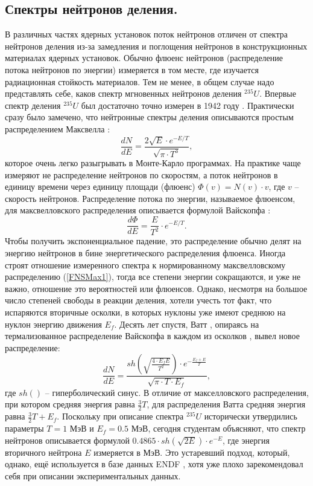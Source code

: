 \documentclass[a4paper,12pt]{article}
\begin{document}
\begin{large}
\subsection{Спектры нейтронов деления.}
\label{subSol2}

  В различных частях ядерных установок поток нейтронов отличен от спектра нейтронов деления из-за замедления и поглощения нейтронов в конструкционных материалах ядерных установок.
  Обычно флюенс нейтронов (распределение потока нейтронов по энергии) измеряется в том месте, где изучается радиационная стойкость материалов.
  Тем не менее, в общем случае надо представлять себе, каков спектр мгновенных нейтронов деления $^{235}U$.
  Впервые спектр деления $^{235}U$ был достаточно точно измерен в 1942 году \cite{Peierls42}.
  Практически сразу было замечено, что нейтронные спектры деления описываются простым распределением Максвелла \cite{Weiss37}:
  \begin{equation}
  \label{PNSMax1}
  \frac{dN}{dE}=\frac{2\sqrt{E}\cdot e^{-E/T}}{\sqrt{\pi\cdot T^3}},
  \end{equation}
  которое очень легко разыгрывать в Монте-Карло программах.
  На практике чаще измеряют не распределение нейтронов по скоростям, а поток нейтронов в единицу времени через единицу площади (флюенс) $\Phi(v)=N(v)\cdot v$, где $v$ -- скорость нейтронов.
  Распределение потока по энергии, называемое флюенсом, для максвелловского распределения описывается формулой Вайскопфа \cite{Weiss37}:
  \begin{equation}
  \label{FNSMax1}
  \frac{d\Phi}{dE}=\frac{E}{T^2}\cdot e^{-E/T}.
  \end{equation}
  Чтобы получить экспоненциальное падение, это распределение обычно делят на энергию нейтронов в бине энергетического распределения флюенса.
  Иногда строят отношение измеренного спектра к нормированному максвелловскому распределению (\ref{FNSMax1}), тогда все степени энергии сокращаются, и уже не важно, отношение это вероятностей или флюенсов.
  Однако, несмотря на большое число степеней свободы в реакции деления, хотели учесть тот факт, что испаряются вторичные осколки, в которых нуклоны уже имеют среднюю на нуклон энергию движения $E_f$.
  Десять лет спустя, Ватт \cite{Watt52}, опираясь на термализованное распределение Вайскопфа в каждом из осколков \cite{Weiss37}, вывел новое распределение:
  \begin{equation}
  \label{PNSMax2}
  \frac{dN}{dE}=\frac{sh\left(\sqrt{\frac{4\cdot E_fE}{T^2}}\right)\cdot e^{-\frac{E_f+E}{T}}}{\sqrt{\pi\cdot T\cdot E_f}},
  \end{equation}
  где $sh()$ -- гиперболический синус.
  В отличие от макселловского распределения, при котором средняя энергия равна $\frac{3}{2}T$, для распределения Ватта средняя энергия равна $\frac{3}{2}T+E_f$.
  Поскольку при описание спектра $^{235}U$ исторически утвердились параметры $T=1$ МэВ и $E_f=0.5$ МэВ, сегодня студентам объясняют, что спектр нейтронов описывается формулой $0.4865\cdot sh(\sqrt{2E})\cdot e^{-E}$, где энергия вторичного нейтрона $E$ измеряется в МэВ.
  Это устаревший подход, который, однако, ещё используется в базе данных ENDF \cite{ENDF/B-VII.1}, хотя уже плохо зарекомендовал себя при описании экспериментальных данных.
  

\end{large}
\end{document}
